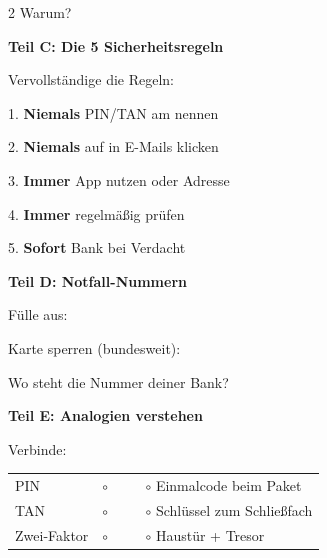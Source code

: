 \documentclass[a4paper,landscape,8pt]{extarticle}
\begin{document}
\begin{multicols}{2}
Warum? \dotfill

\columnbreak

\textbf{\large Teil C: Die 5 Sicherheitsregeln}

Vervollständige die Regeln:

\vspace{3mm}

1. \textbf{Niemals} PIN/TAN am \dotfill nennen

\vspace{2mm}

2. \textbf{Niemals} auf \dotfill in E-Mails klicken

\vspace{2mm}

3. \textbf{Immer} App nutzen oder Adresse \dotfill

\vspace{2mm}

4. \textbf{Immer} \dotfill regelmäßig prüfen

\vspace{2mm}

5. \textbf{Sofort} Bank \dotfill bei Verdacht

\vspace{6mm}

\textbf{\large Teil D: Notfall-Nummern}

Fülle aus:

\vspace{3mm}

Karte sperren (bundesweit): \dotfill

\vspace{3mm}

Wo steht die Nummer deiner Bank? \dotfill

\vspace{6mm}

\textbf{\large Teil E: Analogien verstehen}

Verbinde:

\vspace{2mm}

\renewcommand{\arraystretch}{1.8}
\begin{tabular}{@{}p{3cm}p{4.5cm}@{}}
PIN & $\circ$ ~~~~ $\circ$ Einmalcode beim Paket \\
TAN & $\circ$ ~~~~ $\circ$ Schlüssel zum Schließfach \\
Zwei-Faktor & $\circ$ ~~~~ $\circ$ Haustür + Tresor \\
\end{tabular}
\renewcommand{\arraystretch}{1}

\end{multicols}
\end{document}
